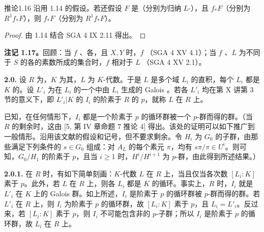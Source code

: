 \begin{SGAresult}{推论}{1.16}
沿用 1.14 的假设。若还假设 $F$ 是（分别为归纳 $L$-），且 $f_*F$（分别为 $R^1f_*F$），则 $f_*F$（分别为 $R^1f_*F$）。
\end{SGAresult}
\begin{proof}
由 1.14 结合 SGA 4 IX 2.11 得出。
\end{proof}

\textbf{注记 1.17。}回顾：当 $f$ 、各，且 $X,Y$  时，$f$ （SGA 4 XV 4.1）；当 $f$ 、$L$ 为不同于 $S$ 的各的素数所成的集合时，$f$ 相对于 $L$ （SGA 4 XV 2.1）。

\textbf{2.0.} 设 $R$ 为，$K$ 为其，$L$ 为 $K$-代数。于是 $L$ 是多个域 $L_i$ 的直积，每个 $L_i$ 都是 $K$ 的。设 $L'_i$ 为在 $L_i$ 的一个中由 $L_i$ 生成的 Galois 。若各 $L'_i$ 均在第 X 讲第 3 节的意义下，即 $L'_i|K$ 的 $I_i$ 的阶素于 $R$ 的 $p$，就称 $L$ 在 $R$ 上。

已知，在任何情形下，$I_i$ 都是一个阶素于 $p$ 的循环群被一个 $p$-群而得的群。（当 $R$ 的剩余时，这由 [5, 第 IV 章命题 7 推论 4] 得出。该处的证明可以如下推广到一般情形。沿用该文献的假设和记号，但不要求剩余。令 $H_i$ 为 $G_0$ 的子群，由那些满足下列条件的 $s\in G_0$ 组成：对 $A_L$ 的每个素元 $\pi$，均有 $s\pi/\pi\in U^i$。则可知，$G_0/H_1$ 的阶素于 $p$，且当 $i\geqslant1$ 时，$H^i/H^{i+1}$ 为 $p$-群，由此得到所述结果。）

\textbf{2.0.1.} 在 $R$ 时，有如下简单刻画：$K$-代数 $L$ 在 $R$ 上，当且仅当各次数 $[L_i:K]$ 素于 $p$。此外，若 $L$ 在 $R$ 上，则各 $L_i$ 都是 $K$ 的循环。事实上，$R$ 时，$I_i$ 就是 $L'_i$ 在 $K$ 上的 Galois 群。如上所述，$I_i$ 是阶素于 $p$ 的循环群被 $p$-群而得的群。若 $L'_i$ 在 $R$ 上，则 $I_i$ 为阶素于 $p$ 的循环群，故 $[L_i:K]$ 素于 $p$，且 $L_i=L'_i$。反过来，若 $[L_i:K]$ 素于 $p$，则 $I_i$ 不可能包含非的 $p$-子群；所以 $I_i$ 是阶素于 $p$ 的循环群，故 $L_i$ 在 $R$ 上。


